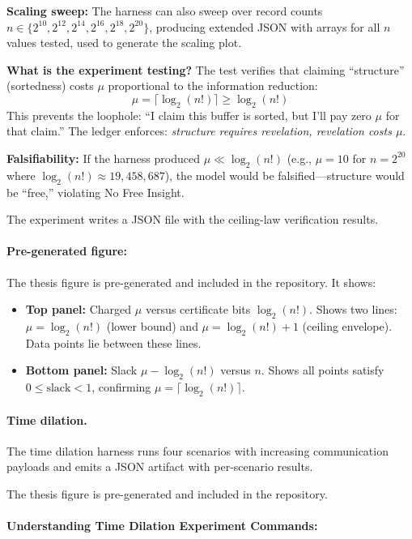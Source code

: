 \textbf{Scaling sweep:} The harness can also sweep over record counts $n \in \{2^{10}, 2^{12}, 2^{14}, 2^{16}, 2^{18}, 2^{20}\}$, producing extended JSON with arrays for all $n$ values tested, used to generate the scaling plot.

\textbf{What is the experiment testing?} The test verifies that claiming ``structure'' (sortedness) costs $\mu$ proportional to the information reduction:
\[
\mu = \lceil \log_2(n!) \rceil \geq \log_2(n!)
\]
This prevents the loophole: ``I claim this buffer is sorted, but I'll pay zero $\mu$ for that claim.'' The ledger enforces: \textit{structure requires revelation, revelation costs $\mu$}.

\textbf{Falsifiability:} If the harness produced $\mu \ll \log_2(n!)$ (e.g., $\mu = 10$ for $n = 2^{20}$ where $\log_2(n!) \approx 19{,}458{,}687$), the model would be falsified---structure would be ``free,'' violating No Free Insight.

The experiment writes a JSON file with the ceiling-law verification results.

\paragraph{Pre-generated figure:}

The thesis figure  is pre-generated and included in the repository. It shows:
\begin{itemize}
    \item \textbf{Top panel:} Charged $\mu$ versus certificate bits $\log_2(n!)$. Shows two lines: $\mu = \log_2(n!)$ (lower bound) and $\mu = \log_2(n!) + 1$ (ceiling envelope). Data points lie between these lines.
    \item \textbf{Bottom panel:} Slack $\mu - \log_2(n!)$ versus $n$. Shows all points satisfy $0 \leq \text{slack} < 1$, confirming $\mu = \lceil \log_2(n!) \rceil$.
\end{itemize}

\paragraph{Time dilation.} The time dilation harness runs four scenarios with increasing communication payloads and emits a JSON artifact with per-scenario results.

The thesis figure  is pre-generated and included in the repository.

\paragraph{Understanding Time Dilation Experiment Commands:}

